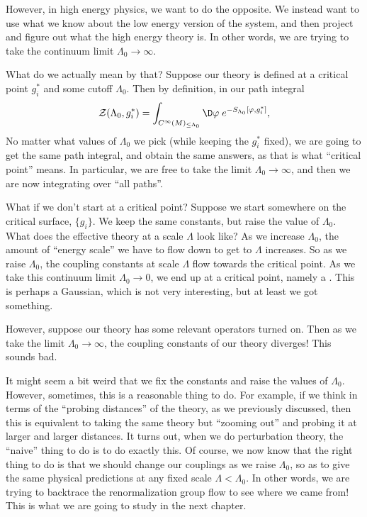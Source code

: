 \documentclass[a4paper]{article}
\begin{document}
However, in high energy physics, we want to do the opposite. We instead want to use what we know about the low energy version of the system, and then project and figure out what the high energy theory is. In other words, we are trying to take the continuum limit $\Lambda_0 \to \infty$.

What do we actually mean by that? Suppose our theory is defined at a critical point $g_i^*$ and some cutoff $\Lambda_0$. Then by definition, in our path integral
\[
  \mathcal{Z}(\Lambda_0, g_i^*) = \int_{C^\infty(M)_{\leq \Lambda_0}} \D \varphi\;e^{-S_{\Lambda_0}[\varphi, g_i^*]},
\]
No matter what values of $\Lambda_0$ we pick (while keeping the $g_i^*$ fixed), we are going to get the same path integral, and obtain the same answers, as that is what ``critical point'' means. In particular, we are free to take the limit $\Lambda_0 \to \infty$, and then we are now integrating over ``all paths''.

What if we don't start at a critical point? Suppose we start somewhere on the critical surface, $\{g_i\}$. We keep the same constants, but raise the value of $\Lambda_0$. What does the effective theory at a scale $\Lambda$ look like? As we increase $\Lambda_0$, the amount of ``energy scale'' we have to flow down to get to $\Lambda$ increases. So as we raise $\Lambda_0$, the coupling constants at scale $\Lambda$ flow towards the critical point. As we take this continuum limit $\Lambda_0 \to 0$, we end up at a critical point, namely a . This is perhaps a Gaussian, which is not very interesting, but at least we got something.

However, suppose our theory has some relevant operators turned on. Then as we take the limit $\Lambda_0 \to \infty$, the coupling constants of our theory diverges! This sounds bad.

It might seem a bit weird that we fix the constants and raise the values of $\Lambda_0$. However, sometimes, this is a reasonable thing to do. For example, if we think in terms of the ``probing distances'' of the theory, as we previously discussed, then this is equivalent to taking the same theory but ``zooming out'' and probing it at larger and larger distances. It turns out, when we do perturbation theory, the ``naive'' thing to do is to do exactly this. Of course, we now know that the right thing to do is that we should change our couplings as we raise $\Lambda_0$, so as to give the same physical predictions at any fixed scale $\Lambda < \Lambda_0$. In other words, we are trying to backtrace the renormalization group flow to see where we came from! This is what we are going to study in the next chapter.
\end{document}
